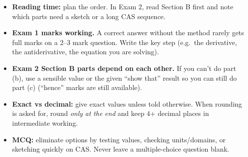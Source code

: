 \begin{tip}
\begin{itemize}
  \item \textbf{Reading time:} plan the order. In Exam 2, read Section B first and note which parts need a sketch or a long CAS sequence.
  \item \textbf{Exam 1 marks working.} A correct answer without the method rarely gets full marks on a 2--3 mark question. Write the key step (e.g.\ the derivative, the antiderivative, the equation you are solving).
  \item \textbf{Exam 2 Section B parts depend on each other.} If you can't do part (b), use a sensible value or the given ``show that'' result so you can still do part (c) (``hence'' marks are still available).
  \item \textbf{Exact vs decimal:} give exact values unless told otherwise. When rounding is asked for, round \emph{only at the end} and keep 4+ decimal places in intermediate working.
  \item \textbf{MCQ:} eliminate options by testing values, checking units/domains, or sketching quickly on CAS. Never leave a multiple-choice question blank.
\end{itemize}
\end{tip}
